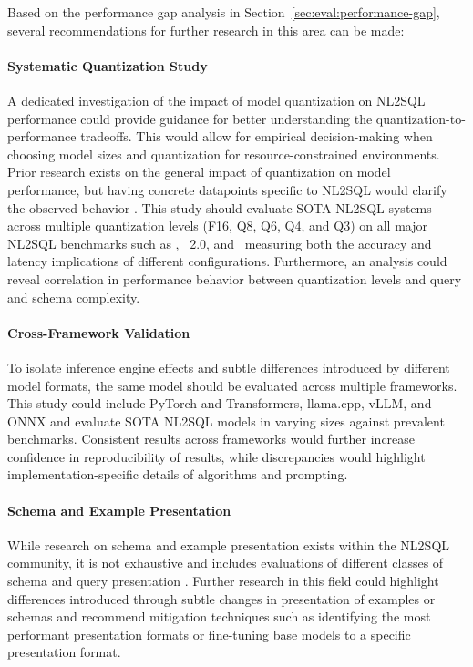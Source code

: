 Based on the performance gap analysis in Section~\ref{sec:eval:performance-gap},
several recommendations for further research in this area can be made:

\paragraph{Systematic Quantization Study}

A dedicated investigation of the impact of model quantization on NL2SQL
performance could provide guidance for better understanding the quantization-to-performance
tradeoffs. This would allow for empirical decision-making when
choosing model sizes and quantization for resource-constrained
environments. Prior research exists on the general impact of quantization on
model performance, but having concrete datapoints specific to NL2SQL would
clarify the observed behavior \citep{Int8AtScale}. This study should evaluate
SOTA NL2SQL systems across multiple quantization levels (F16, Q8,
Q6, Q4, and Q3) on all major NL2SQL benchmarks such as \Spider, \Spider~2.0, and
\Bird~measuring both the accuracy and latency implications of different
configurations. Furthermore, an analysis could reveal correlation in performance
behavior between quantization levels and query and schema complexity.

\paragraph{Cross-Framework Validation}

To isolate inference engine effects and subtle differences introduced by
different model formats, the same model should be evaluated across multiple
frameworks. This study could include PyTorch and Transformers, llama.cpp, vLLM,
and ONNX and evaluate SOTA NL2SQL models in varying sizes against
prevalent benchmarks. Consistent results across frameworks would further
increase confidence in reproducibility of results, while discrepancies would
highlight implementation-specific details of algorithms and
prompting.

\paragraph{Schema and Example Presentation}

While research on schema and example presentation exists within the NL2SQL
community, it is not exhaustive and includes evaluations of different classes
of schema and query presentation \citep{DAIL-SQL, XiYan}. Further research in
this field could highlight differences introduced through subtle changes in
presentation of examples or schemas and recommend mitigation techniques such as
identifying the most performant presentation formats or fine-tuning base models
to a specific presentation format.

